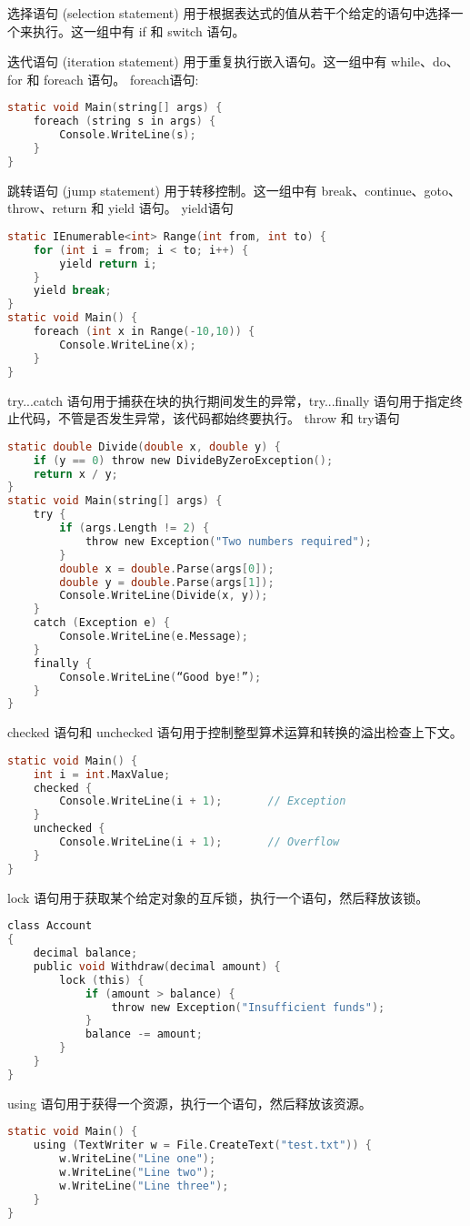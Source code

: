 选择语句 (selection statement) 用于根据表达式的值从若干个给定的语句中选择一个来执行。这一组中有 if 和 switch 语句。

迭代语句 (iteration statement) 用于重复执行嵌入语句。这一组中有 while、do、for 和 foreach 语句。
foreach语句:
\begin{lstlisting}[language=C]
static void Main(string[] args) {
    foreach (string s in args) {
        Console.WriteLine(s);
    }
}
\end{lstlisting}


跳转语句 (jump statement) 用于转移控制。这一组中有 break、continue、goto、throw、return 和 yield 语句。
yield语句
\begin{lstlisting}[language=C]
static IEnumerable<int> Range(int from, int to) {
    for (int i = from; i < to; i++) {
        yield return i;
    }
    yield break;
}
static void Main() {
    foreach (int x in Range(-10,10)) {
        Console.WriteLine(x);
    }
}
\end{lstlisting}

try...catch 语句用于捕获在块的执行期间发生的异常，try...finally 语句用于指定终止代码，不管是否发生异常，该代码都始终要执行。
throw 和 try语句
 \begin{lstlisting}[language=C]
 static double Divide(double x, double y) {
    if (y == 0) throw new DivideByZeroException();
    return x / y;
}
static void Main(string[] args) {
    try {
        if (args.Length != 2) {
            throw new Exception("Two numbers required");
        }
        double x = double.Parse(args[0]);
        double y = double.Parse(args[1]);
        Console.WriteLine(Divide(x, y));
    }
    catch (Exception e) {
        Console.WriteLine(e.Message);
    }
    finally {
        Console.WriteLine(“Good bye!”);
    }
}
\end{lstlisting}

checked 语句和 unchecked 语句用于控制整型算术运算和转换的溢出检查上下文。
 \begin{lstlisting}[language=C]
static void Main() {
    int i = int.MaxValue;
    checked {
        Console.WriteLine(i + 1);       // Exception
    }
    unchecked {
        Console.WriteLine(i + 1);       // Overflow
    }
}
\end{lstlisting}

lock 语句用于获取某个给定对象的互斥锁，执行一个语句，然后释放该锁。
 \begin{lstlisting}[language=C]
class Account
{
    decimal balance;
    public void Withdraw(decimal amount) {
        lock (this) {
            if (amount > balance) {
                throw new Exception("Insufficient funds");
            }
            balance -= amount;
        }
    }
}
\end{lstlisting}

using 语句用于获得一个资源，执行一个语句，然后释放该资源。
 \begin{lstlisting}[language=C]
static void Main() {
    using (TextWriter w = File.CreateText("test.txt")) {
        w.WriteLine("Line one");
        w.WriteLine("Line two");
        w.WriteLine("Line three");
    }
}
\end{lstlisting}


